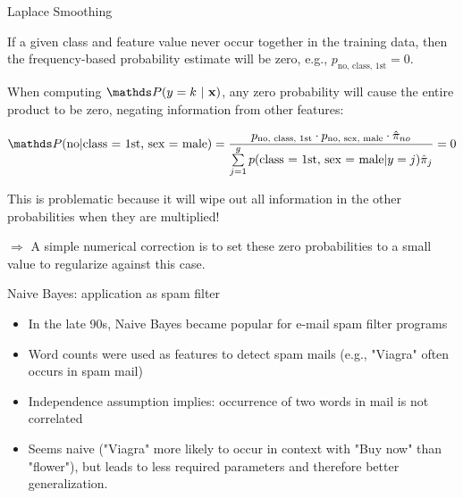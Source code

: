 \documentclass[11pt,compress,t,notes=noshow, xcolor=table]{beamer}
\begin{document}
\begin{vbframe}{Laplace Smoothing}
\begin{small}
If a given class and feature value never occur together in the training data, then the frequency-based probability estimate will be zero, e.g., $p_{\text{no, class, 1st}} = 0$.

\lz

When computing $\postk$, any zero probability will cause the entire product to be zero, negating information from other features:

$$
\P(\text{no} | \text{class = 1st, sex = male}) = \frac{p_{\text{no, class, 1st}} \cdot p_{\text{no, sex, male}} \cdot \pikh[no]}{\sumjg p(\text{class = 1st, sex = male} | y = j)\pih_j} = 0
$$

This is problematic because it will wipe out all information in the other probabilities when they are multiplied!

\lz

$\Rightarrow$ A simple numerical correction is to set these zero probabilities to a small value to regularize against this case.

\end{small}

\end{vbframe}

\begin{vbframe}{Naive Bayes: application as spam filter}
\begin{itemize}
  \item In the late 90s, Naive Bayes became popular for e-mail spam filter programs
  \item Word counts were used as features to detect spam mails (e.g., "Viagra" often occurs in spam mail)
  \item Independence assumption implies: occurrence of two words in mail is not correlated
  \item Seems naive ("Viagra" more likely to occur in context with "Buy now" than "flower"), but leads to less required parameters and therefore better generalization.
\end{itemize}
\end{vbframe}
\end{document}

